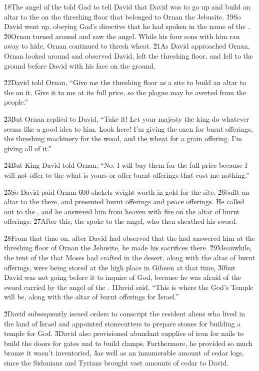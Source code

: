 \v{18}The angel of the  told Gad to tell David that David was to go up and build an altar to the  on the threshing floor that belonged to Ornan the Jebusite. \v{19}So David went up, obeying Gad's directive that he had spoken in the name of the . \v{20}Ornan turned around and saw the angel. While his four sons with him ran away to hide, Ornan continued to thresh wheat. \v{21}As David approached Ornan, Ornan looked around and observed David, left the threshing floor, and fell to the ground before David with his face on the ground.

\v{22}David told Ornan, ``Give me the threshing floor as a site to build an altar to the  on it. Give it to me at its full price, so the plague may be averted from the people.''

\v{23}But Ornan replied to David, ``Take it! Let your majesty the king do whatever seems like a good idea to him. Look here! I'm giving the oxen for burnt offerings, the threshing machinery for the wood, and the wheat for a grain offering. I'm giving all of it.''

\v{24}But King David told Ornan, ``No. I will buy them for the full price because I will not offer to the  what is yours or offer burnt offerings that cost me nothing.''

\v{25}So David paid Ornan 600 shekels weight worth in gold for the site, \v{26}built an altar to the  there, and presented burnt offerings and peace offerings. He called out to the , and he answered him from heaven with fire on the altar of burnt offerings. \v{27}After this, the  spoke to the angel, who then sheathed his sword.

\v{28}From that time on, after David had observed that the  had answered him at the threshing floor of Ornan the Jebusite, he made his sacrifices there. \v{29}Meanwhile, the tent of the  that Moses had crafted in the desert, along with the altar of burnt offerings, were being stored at the high place in Gibeon at that time, \v{30}but David was not going before it to inquire of God, because he was afraid of the sword carried by the angel of the .
\v{1}David said, ``This is where the  God's Temple will be, along with the altar of burnt offerings for Israel.''

\v{2}David subsequently issued orders to conscript the resident aliens who lived in the land of Israel and appointed stonecutters to prepare stones for building a temple for God. \v{3}David also provisioned abundant supplies of iron for nails to build the doors for gates and to build clamps. Furthermore, he provided so much bronze it wasn't inventoried, \v{4}as well as an innumerable amount of cedar logs, since the Sidonians and Tyrians brought vast amounts of cedar to David.

